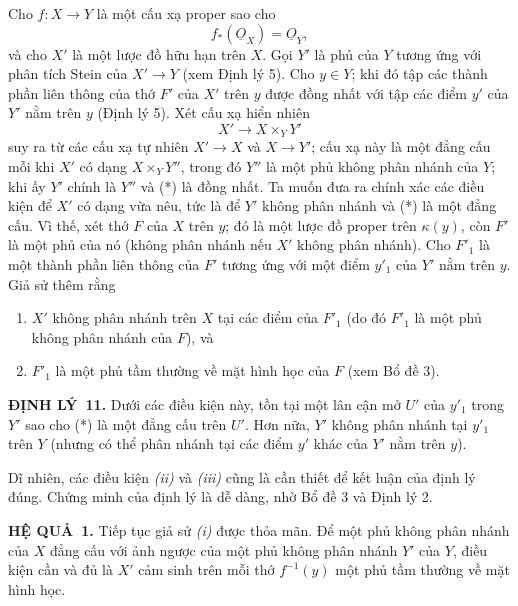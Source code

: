 \documentclass[11pt,twoside,openany]{book}
\numberwithin{equation}{section}
\newcommand{\src}[1]{%
  \phantomsection\hypertarget{src:\fgasourceid:#1}{}%
  \marginpar{\raggedleft\footnotesize\sffamily #1}%
}
\newcommand{\fgasourceid}{unset}
\newcommand{\Osh}{\underline{O}}
\newcommand{\result}[2]{\par\medskip\noindent\textbf{#1\if\relax\detokenize{#2}\relax\else\ #2\fi.}\quad}
\begin{document}
Cho $f:X\longrightarrow Y$ là một cấu xạ proper sao cho
\begin{equation}
  \tag{i}
  f_*(\Osh_X)=\Osh_Y,
\end{equation}
và cho $X'$ là một lược đồ hữu hạn trên $X$. Gọi $Y'$ là phủ của $Y$ tương ứng
với phân tích Stein của $X'\longrightarrow Y$ (xem Định lý 5). Cho $y\in Y$;
khi đó tập các thành phần liên thông của thớ $F'$ của $X'$ trên $y$ được đồng
nhất với tập các điểm $y'$ của $Y'$ nằm trên $y$ (Định lý 5). Xét cấu xạ hiển
nhiên
\begin{equation}
  \tag{*}
  X'\longrightarrow X\times_Y Y'
\end{equation}
suy ra từ các cấu xạ tự nhiên $X'\longrightarrow X$ và
$X\longrightarrow Y'$; cấu xạ này là một
đẳng cấu mỗi khi $X'$ có dạng $X\times_Y Y''$, trong đó $Y''$ là một phủ không
phân nhánh của $Y$; khi ấy $Y'$ chính là $Y''$ và (*) là đồng nhất. Ta muốn
đưa ra chính xác các điều kiện để $X'$ có dạng vừa nêu, tức là để $Y'$ không
phân nhánh và (*) là một đẳng cấu. Vì thế, xét thớ $F$ của $X$ trên $y$; đó là
một lược đồ proper trên $\kappa(y)$, còn $F'$ là một phủ của nó (không phân
nhánh nếu $X'$ không phân nhánh). Cho $F'_1$ là một thành phần liên thông của
$F'$ tương ứng với một điểm $y'_1$ của $Y'$ nằm trên $y$. Giả sử thêm rằng
\begin{enumerate}
  \item[\textit{(ii)}] $X'$ không phân nhánh trên $X$ tại các điểm của $F'_1$
    (do đó $F'_1$ là một phủ không phân nhánh của $F$), và
  \item[\textit{(iii)}] $F'_1$ là một phủ tầm thường về mặt hình học của $F$
    (xem Bổ đề 3).
\end{enumerate}

\result{ĐỊNH LÝ}{11} Dưới các điều kiện này, tồn tại một lân cận mở $U'$ của
$y'_1$ trong $Y'$ sao cho (*) là một đẳng cấu trên $U'$. Hơn nữa, $Y'$ không
phân nhánh tại $y'_1$ trên $Y$ (nhưng có thể phân nhánh tại các điểm $y'$ khác
của $Y'$ nằm trên $y$).

Dĩ nhiên, các điều kiện \textit{(ii)} và \textit{(iii)} cũng là cần thiết để
kết luận của định lý đúng. Chứng minh của định lý là dễ dàng, nhờ Bổ đề 3 và
Định lý 2.


\src{214}
\result{HỆ QUẢ}{1} Tiếp tục giả sử \textit{(i)} được thỏa mãn. Để một phủ
không phân nhánh của $X$ đẳng cấu với ảnh ngược của một phủ không phân
nhánh $Y'$ của $Y$, điều kiện cần và đủ là $X'$ cảm sinh trên mỗi thớ
$f^{-1}(y)$ một phủ tầm thường về mặt hình học.
\end{document}
